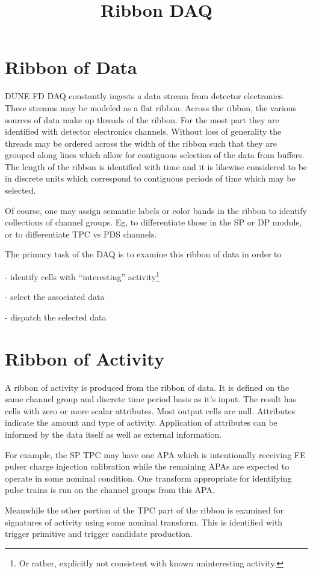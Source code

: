 \documentclass[letterpaper,article,oneside]{memoir}
\title{Ribbon DAQ}
\begin{document}
\section{Ribbon of Data}
\label{sec:intro}

DUNE FD DAQ constantly ingests a data stream from detector electronics. 
These streams may be modeled as a flat ribbon. 
Across the ribbon, the various sources of data make up threads of the ribbon. 
For the most part they are identified with detector electronics channels.
Without loss of generality the threads may be ordered across the width of the ribbon such that they are grouped along lines which allow for contiguous selection of the data from buffers. 
The length of the ribbon is identified with time and it is likewise considered to be in discrete units which correspond to contiguous periods of time which may be selected.

Of course, one may assign semantic labels or color bands in the ribbon to identify collections of channel groups. 
Eg, to differentiate those in the SP or DP module, or to differentiate TPC vs PDS channels.

The primary task of the DAQ is to examine this ribbon of data in order to

- identify cells with ``interesting'' activity\footnote{Or rather, explicitly not consistent with known uninteresting activity.}

- select the associated data

- dispatch the selected data

\section{Ribbon of Activity}

A ribbon of activity is produced from the ribbon of data.
It is defined on the same channel group and discrete time period basis as it's input. 
The result has cells with zero or more scalar attributes. 
Most output cells are null. 
Attributes indicate the amount and type of activity. 
Application of attributes can be informed by the data itself as well as external information.

For example, the SP TPC may have one APA which is intentionally receiving FE pulser charge injection calibration while the remaining APAs are expected to operate in some nominal condition. 
One transform appropriate for identifying pulse trains is run on the channel groups from this APA. 

Meanwhile the other portion of the TPC part of the ribbon is examined for signatures of activity using some nominal transform.
This is identified with trigger primitive and trigger candidate production. 
\end{document}
